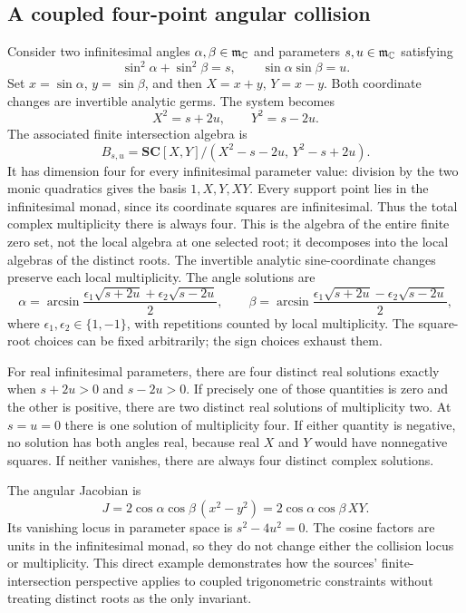 \documentclass[11pt,letterpaper]{article}
\theoremstyle{definition}
\theoremstyle{remark}
\newcommand{\SC}{\mathbf{SC}}
\newcommand{\arcs}{\operatorname{arcsin}}
\numberwithin{equation}{section}
\begin{document}
\subsection{A coupled four-point angular collision}\label{subsec:coupled}
Consider two infinitesimal angles $\alpha,\beta\in\mathfrak m_\mathbb C$ and parameters $s,u\in\mathfrak m_\mathbb C$ satisfying
\begin{equation}\label{eq:coupled}
 \sin^2\alpha+\sin^2\beta=s,
 \qquad \sin\alpha\sin\beta=u.
\end{equation}
Set $x=\sin\alpha$, $y=\sin\beta$, and then $X=x+y$, $Y=x-y$. Both coordinate changes are invertible analytic germs. The system becomes
\begin{equation}\label{eq:coupleddiagonal}
 X^2=s+2u,\qquad Y^2=s-2u.
\end{equation}
The associated finite intersection algebra is
\[
 B_{s,u}=\SC[X,Y]/(X^2-s-2u,\,Y^2-s+2u).
\]
It has dimension four for every infinitesimal parameter value: division by the two monic quadratics gives the basis $1,X,Y,XY$. Every support point lies in the infinitesimal monad, since its coordinate squares are infinitesimal. Thus the total complex multiplicity there is always four. This is the algebra of the entire finite zero set, not the local algebra at one selected root; it decomposes into the local algebras of the distinct roots. The invertible analytic sine-coordinate changes preserve each local multiplicity. The angle solutions are
\begin{equation}\label{eq:coupledroots}
 \alpha=\arcs\frac{\epsilon_1\sqrt{s+2u}+\epsilon_2\sqrt{s-2u}}2,
 \qquad
 \beta=\arcs\frac{\epsilon_1\sqrt{s+2u}-\epsilon_2\sqrt{s-2u}}2,
\end{equation}
where $\epsilon_1,\epsilon_2\in\{1,-1\}$, with repetitions counted by local multiplicity. The square-root choices can be fixed arbitrarily; the sign choices exhaust them.

For real infinitesimal parameters, there are four distinct real solutions exactly when $s+2u>0$ and $s-2u>0$. If precisely one of those quantities is zero and the other is positive, there are two distinct real solutions of multiplicity two. At $s=u=0$ there is one solution of multiplicity four. If either quantity is negative, no solution has both angles real, because real $X$ and $Y$ would have nonnegative squares. If neither vanishes, there are always four distinct complex solutions.

The angular Jacobian is
\[
 J=2\cos\alpha\cos\beta\,(x^2-y^2)
   =2\cos\alpha\cos\beta\,XY.
\]
Its vanishing locus in parameter space is $s^2-4u^2=0$. The cosine factors are units in the infinitesimal monad, so they do not change either the collision locus or multiplicity. This direct example demonstrates how the sources' finite-intersection perspective applies to coupled trigonometric constraints without treating distinct roots as the only invariant.
\end{document}
